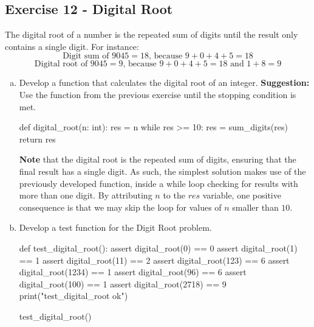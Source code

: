 \documentclass[12pt]{article}
\begin{document}
\subsection*{Exercise 12 - Digital Root}
The digital root of a number is the repeated sum of digits until the result only
contains a single digit. For instance:
\[\text{Digit sum of } 9045 = 18 \text{, because } 9+0+4+5 = 18\]
\[\text{Digital root of } 9045 = 9 \text{, because } 9+0+4+5 = 18 \text{ and } 
1+8 = 9 \]
\begin{enumerate}[a)]
  \item Develop a function that calculates the digital root of an integer. 
  \textbf{Suggestion:} Use the function from the previous exercise until the 
    stopping condition is met.
\begin{pythonlst}
def digital_root(n: int):
  res = n
  while res >= 10:
    res = sum_digits(res)
  return res
\end{pythonlst}
\textbf{Note} that the digital root is the repeated sum of digits, ensuring that
the final result has a single digit. As such, the simplest solution makes use of
the previously developed function, inside a while loop checking for results with
more than one digit. By attributing $n$ to the $res$ variable, one positive
consequence is that we may skip the loop for values of $n$ smaller than $10$.
  \item Develop a test function for the Digit Root problem.
\begin{pythonlst}
def test_digital_root():
  assert digital_root(0) == 0
  assert digital_root(1) == 1
  assert digital_root(11) == 2
  assert digital_root(123) == 6
  assert digital_root(1234) == 1
  assert digital_root(96) == 6
  assert digital_root(100) == 1
  assert digital_root(2718) == 9
  print("test_digital_root ok")

test_digital_root()
\end{pythonlst}
\end{enumerate}
\end{document}
